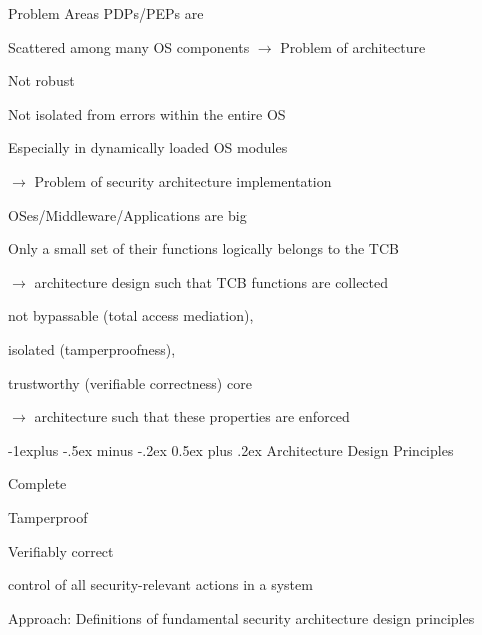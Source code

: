 \documentclass[a4paper]{article}
\makeatletter
\renewcommand{\subsection}{\@startsection{subsection}{2}{0mm}%
                {-1explus -.5ex minus -.2ex}%
                {0.5ex plus .2ex}%
                {\normalfont\normalsize\bfseries}}
\makeatother
\begin{document}
\begin{multicols}{3}
    Problem Areas PDPs/PEPs are
    \begin{itemize*}
        \item Scattered among many OS components $\rightarrow$ Problem of architecture
        \item Not robust
        \begin{itemize*}
            \item Not isolated from errors within the entire OS
            \item Especially in dynamically loaded OS modules
            \item[$\rightarrow$] Problem of security architecture implementation
        \end{itemize*}
        \item OSes/Middleware/Applications are big
        \item Only a small set of their functions logically belongs to the TCB
        \item[$\rightarrow$] architecture design such that TCB functions are collected
        \begin{itemize*}
            \item not bypassable (total access mediation),
            \item isolated (tamperproofness),
            \item trustworthy (verifiable correctness) core
            \item[$\rightarrow$] architecture such that these properties are enforced
        \end{itemize*}
    \end{itemize*}

    \subsection{Architecture Design Principles}
    \begin{itemize*}
        \item Complete
        \item Tamperproof
        \item Verifiably correct
        \item control of all security-relevant actions in a system
    \end{itemize*}

    Approach: Definitions of fundamental security architecture design principles


\end{multicols}
\end{document}
